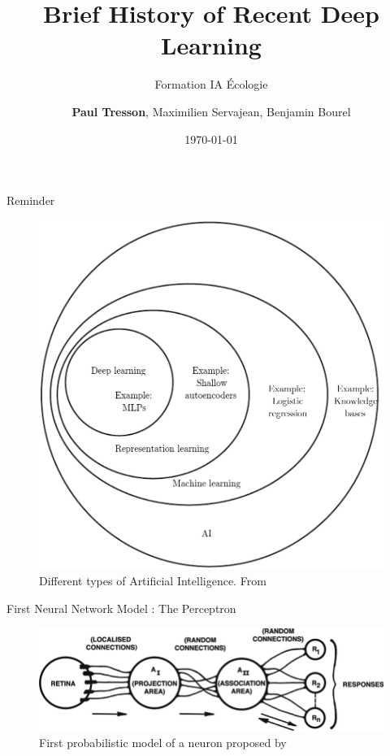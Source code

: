 \documentclass{irdbeamer}
\title{Brief History of Recent Deep Learning}
\subtitle{Formation IA Écologie}
\author[Paul Tresson]{\textbf{Paul Tresson}, Maximilien Servajean, Benjamin Bourel}
\date{\today} %
\institute[Institut de Recherche pour le Développement]{UMR AMAP}
\let\oldcite=\cite
\renewcommand{\cite}[1]{\textcolor[rgb]{.5,.5,.7}{\oldcite{#1}}}
\begin{document}
\maketitle

\usebackgroundtemplate{}

\begin{frame}{Reminder}
    \begin{figure}
        \centering
        \vspace{-1cm}
        \includegraphics[width=0.45\linewidth]{figs/goodfellow_AI.png}
        \caption{\tiny Different types of Artificial Intelligence. From \cite{goodfellow2016deep}}
    \end{figure}
\end{frame}

\begin{frame}[t]{First Neural Network Model : The Perceptron}
    \begin{figure}
        \centering
        \includegraphics[width=\linewidth]{figs/perceptron.png}
        \caption{\tiny First probabilistic model of a neuron proposed by \cite{rosenblatt1958perceptron}}
    \end{figure}
\end{frame}
\end{document}
